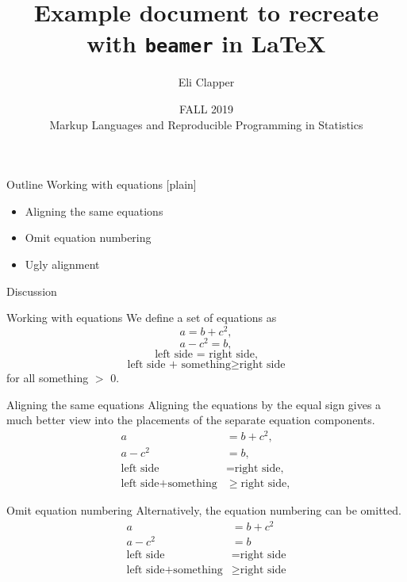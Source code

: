 \documentclass[9pt]{beamer}
\title{Example document to recreate with \texttt{beamer} in \LaTeX}
\author{Eli Clapper \\ [2cm]}
\date{FALL 2019 \\ Markup Languages and Reproducible Programming in Statistics}
\begin{document}
\begin{frame}[plain]
    \titlepage
\end{frame}

\begin{frame}{Outline}
    Working with equations
    [plain]
    \begin{itemize}
        \item[] Aligning the same equations
        \item[] Omit equation numbering
        \item[] Ugly alignment
    \end{itemize}
        
    Discussion
\end{frame}

\begin{frame}{Working with equations}
    We define a set of equations as
    \begin{equation}
         a = b + c^2,
    \end{equation}
    \begin{equation}
        a - c^2 = b,
    \end{equation}
    \begin{equation}
        \text{left side = right side,}  
    \end{equation} 
    \begin{equation}
        \text{left side + something} \geq \text{right side}  
    \end{equation} 
    for all something $>$ 0.
\end{frame}

\begin{frame}{Aligning the same equations}
    Aligning the equations by the equal sign gives a much better view into the placements of the separate equation components.
    \begin{align}
         a &= b + c^2, \\
        a - c^2 &= b, \\
        \text{left side} &= \text{right side,}  \\
        \text{left side} + \text{something} &\geq \text{right side},  
    \end{align} 
\end{frame}

\begin{frame}{Omit equation numbering}
    Alternatively, the equation numbering can be omitted.
    \begin{align*}
         a &= b + c^2 \\
        a - c^2 &= b \\
        \text{left side} &= \text{right side}  \\
        \text{left side} + \text{something} &\geq \text{right side}  
    \end{align*} 
\end{frame}
\end{document}
